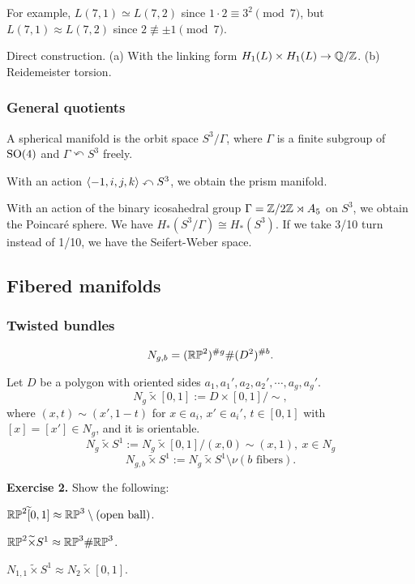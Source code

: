 \documentclass{../../small}
\begin{document}
For example, $L(7,1)\simeq L(7,2)$ since $1\cdot2\equiv 3^2\pmod7$, but $L(7,1)\approx L(7,2)$ since $2\not\equiv\pm1\pmod7$.
\begin{pf}
Direct construction.
(a) With the linking form $H_1(L)\times H_1(L)\to\mathbb{Q}/\mathbb{Z}$.
(b) Reidemeister torsion. 
\end{pf}

\subsubsection*{General quotients}
A spherical manifold is the orbit space $S^3/\Gamma$, where $\Gamma$ is a finite subgroup of $\mathrm{SO}(4)$ and $\Gamma\curvearrowleft S^3$ freely.

\begin{ex*}
With an action $\langle-1,i,j,k\rangle\curvearrowleft S^3$, we obtain the prism manifold.
\end{ex*}
\begin{ex*}
With an action of the binary icosahedral group $\Gamma=\mathbb{Z}/2\mathbb{Z}\rtimes A_5$ on $S^3$, we obtain the Poincar\'e sphere.
We have $H_*(S^3/\Gamma)\cong H_*(S^3)$.
If we take 3/10 turn instead of 1/10, we have the Seifert-Weber space.
\end{ex*}

\subsection{Fibered manifolds}


\subsubsection*{Twisted bundles}
\[N_{g,b}=(\mathbb{RP}^2)^{\#g}\#(D^2)^{\#b}.\]

Let $D$ be a polygon with oriented sides $a_1,a_1',a_2,a_2',\cdots,a_g,a_g'$.
\[N_g\tilde\times[0,1]:=D\times[0,1]/\sim,\] where $(x,t)\sim(x',1-t)$ for $x\in a_i$, $x'\in a_i'$, $t\in[0,1]$ with $[x]=[x']\in N_g$, and it is orientable.
\[N_g\tilde\times S^1:=N_g\tilde\times[0,1]/(x,0)\sim(x,1),\ x\in N_g\]
\[N_{g,b}\tilde\times S^1:=N_g\tilde\times S^1\setminus\nu(b\text{ fibers}).\]

\textbf{Exercise 2.} Show the following:
\begin{parts}
\item $\mathbb{RP}^2\widetilde[0,1]\approx\mathbb{RP}^3\setminus\text{(open ball)}$.
\item $\mathbb{RP}^2\widetilde\times S^1\approx\mathbb{RP}^3\#\mathbb{RP}^3$.
\item $N_{1,1}\tilde\times S^1\approx N_2\tilde\times[0,1]$.
\end{parts}
\end{document}
